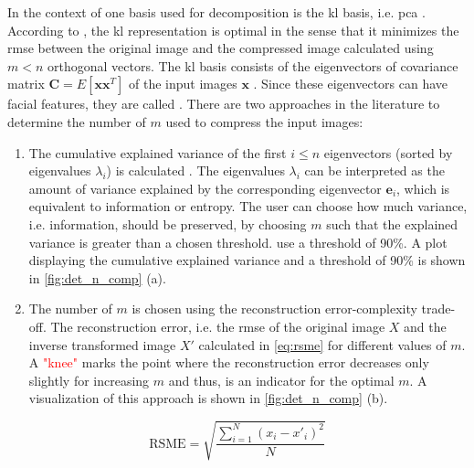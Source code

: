 In the context of \eigenfaces{} one basis used for decomposition is the \ac{kl} basis, i.e. \ac{pca} \cite{eigenfaces1997, eigenfaces1991}.
According to \citeauthor{eigenfaces1997}, the \ac{kl} representation is optimal in the sense that it minimizes the \ac{rmse} between the original image and 
the compressed image calculated using $m < n$ orthogonal vectors.
The \ac{kl} basis consists of the eigenvectors of covariance matrix $\textbf{C} = E\left[ \textbf{x}\textbf{x}^{T} \right]$ of the input images $\mathbf{x}$ \cite{eigenfaces1997}.
Since these eigenvectors can have facial features, they are called \textit{\eigenfaces{}}.
There are two approaches in the literature to determine the number of \eigenfaces{} $m$ used to compress the input images:
\begin{enumerate}[label=(\alph*)]
    \item The cumulative explained variance of the first $i \le n$ eigenvectors (sorted by eigenvalues $\lambda_i$) is calculated 
        \cite{eigenfaces1997, face-recognition2020, face-recognition2021}.
        The eigenvalues $\lambda_i$ can be interpreted as the amount of variance explained by the corresponding eigenvector $\textbf{e}_i$, which is equivalent to information or entropy.
        The user can choose how much variance, i.e. information, should be preserved, by choosing $m$ such that the explained variance is greater than a chosen threshold.
        \citeauthor{face-recognition2021} use a threshold of 90\%.
        A plot displaying the cumulative explained variance and a threshold of 90\% is shown in \autoref{fig:det_n_comp} (a).

    \item The number of \eigenfaces{} $m$ is chosen using the reconstruction error-complexity trade-off. %
        The reconstruction error, i.e. the \ac{rmse} of the original image $X$ and the inverse transformed image $X'$ 
        calculated in \autoref{eq:rsme} for different values of $m$.
        A \textcolor{red}{"knee"} marks the point where the reconstruction error decreases only slightly for increasing $m$ and thus, is an indicator for the optimal $m$.
        A visualization of this approach is shown in \autoref{fig:det_n_comp} (b).
\end{enumerate}

\begin{equation}
    \text{RSME} = \sqrt{\frac{\sum_{i=1}^{N}(x_{i}-x'_i)^2}{N}}
    \label{eq:rsme}
\end{equation}
 
